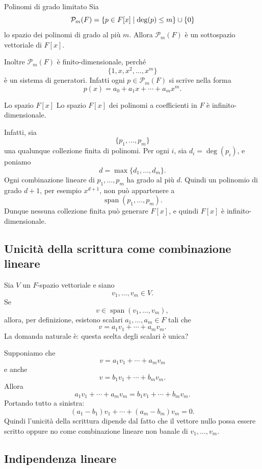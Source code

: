 \documentclass[a4paper]{article}
\begin{document}
\begin{snippetexample}{Polinomi di grado limitato}
    Sia
    \[
        \mathcal{P}_m(F)=\{p\in F[x]\mid \deg(p)\leq m\}\cup\{0\}
    \]
    lo spazio dei polinomi di grado al più \(m\). Allora \(\mathcal{P}_m(F)\) è un sottospazio vettoriale di \(F[x]\).

    Inoltre \(\mathcal{P}_m(F)\) è finito-dimensionale, perché
    \[
        \{1,x,x^2,\ldots,x^m\}
    \]
    è un sistema di generatori. Infatti ogni \(p\in\mathcal{P}_m(F)\) si scrive nella forma
    \[
        p(x)=a_0+a_1x+\cdots+a_mx^m.
    \]
\end{snippetexample}

\begin{snippetexample}{Lo spazio \(F[x]\)}
    Lo spazio \(F[x]\) dei polinomi a coefficienti in \(F\) è infinito-dimensionale.

    Infatti, sia
    \[
        \{p_1,\ldots,p_m\}
    \]
    una qualunque collezione finita di polinomi. Per ogni \(i\), sia \(d_i=\deg(p_i)\), e poniamo
    \[
        d=\max\{d_1,\ldots,d_m\}.
    \]
    Ogni combinazione lineare di \(p_1,\ldots,p_m\) ha grado al più \(d\). Quindi un polinomio di grado \(d+1\), per esempio \(x^{d+1}\), non può appartenere a
    \[
        \operatorname{span}(p_1,\ldots,p_m).
    \]
    Dunque nessuna collezione finita può generare \(F[x]\), e quindi \(F[x]\) è infinito-dimensionale.
\end{snippetexample}

\subsection{Unicità della scrittura come combinazione lineare}

Sia \(V\) un \(F\)-spazio vettoriale e siano
\[
    v_1,\ldots,v_m\in V.
\]
Se
\[
    v\in\operatorname{span}(v_1,\ldots,v_m),
\]
allora, per definizione, esistono scalari \(a_1,\ldots,a_m\in F\) tali che
\[
    v=a_1v_1+\cdots+a_mv_m.
\]
La domanda naturale è: questa scelta degli scalari è unica?

Supponiamo che
\[
    v=a_1v_1+\cdots+a_mv_m
\]
e anche
\[
    v=b_1v_1+\cdots+b_mv_m.
\]
Allora
\[
    a_1v_1+\cdots+a_mv_m
    =
    b_1v_1+\cdots+b_mv_m.
\]
Portando tutto a sinistra:
\[
    (a_1-b_1)v_1+\cdots+(a_m-b_m)v_m=0.
\]
Quindi l'unicità della scrittura dipende dal fatto che il vettore nullo possa essere scritto oppure no come combinazione lineare non banale di \(v_1,\ldots,v_m\).

\subsection{Indipendenza lineare}
\end{document}
